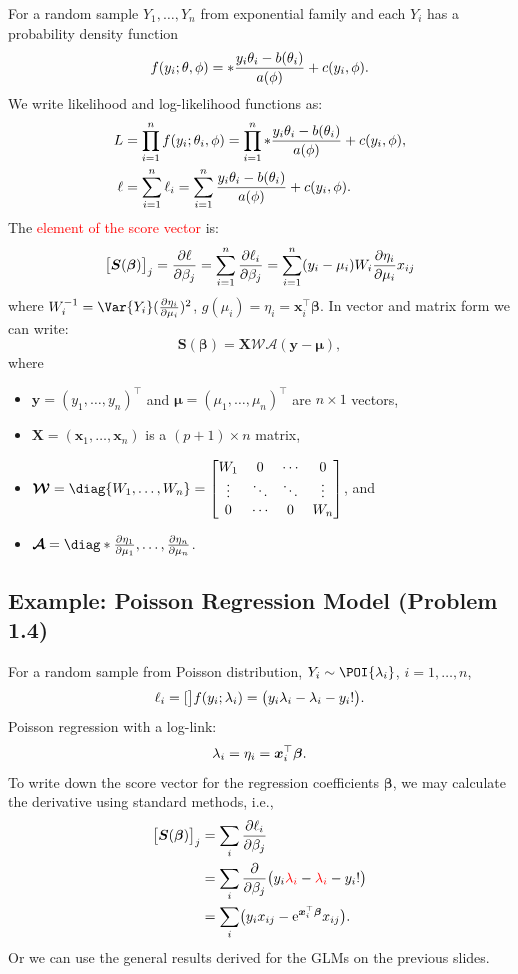\documentclass[oneside]{book}\usepackage[]{graphicx}\usepackage[svgnames]{xcolor}
\let\exp\relax%
\let\log\relax%
\providecommand{\Vector}[1]{\bm{#1}}%
\providecommand{\Matrix}[1]{\bm{#1}}
\providecommand{\MatrixCal}[1]{\bm{\mathcal{#1}}}
\begin{document}
For a random sample $ Y_1,\ldots,Y_n $ from exponential family and each $ Y_i $ has a probability density function
\[ f(y_i;\theta,\phi)=\exp*{\frac{y_i\theta_i-b(\theta_i)}{a(\phi)}+c(y_i,\phi)}. \]
We write likelihood and log-likelihood functions as:
\begin{align*}
    L    & =\prod_{i=1}^n f(y_i;\theta_i,\phi)=\prod_{i=1}^n\exp*{\frac{y_i\theta_i-b(\theta_i)}{a(\phi)}+c(y_i,\phi)}, \\
    \ell & =\sum_{i=1}^{n} \ell_i=\sum_{i=1}^{n}\frac{y_i\theta_i-b(\theta_i)}{a(\phi)}+c(y_i,\phi).
\end{align*}
The \textcolor{Red}{element of the score vector} is:
\[ \bigl[\Vector{S}(\Vector{\beta})\bigr]_j=\pdv{\ell}{\beta_j}=\sum_{i=1}^{n} \pdv{\ell_i}{\beta_j}=\sum_{i=1}^{n} (y_i-\mu_i)W_i\pdv{\eta_i}{\mu_i}x_{ij} \]
where $  W_i^{-1}=\Var{Y_i}(\pdv{\eta_i}{\mu_i})^2 $, $ g(\mu_i)=\eta_i=\Vector{x}_i^\top \Vector{\beta} $. In vector and matrix form we can write:
\[ \Vector{S}(\Vector{\beta})=\Matrix{X}\MatrixCal{W}\MatrixCal{A}(\Vector{y}-\Vector{\mu}), \]
where
\begin{itemize}
    \item $ \Vector{y}=(y_1,\ldots,y_n)^\top $ and $ \Vector{\mu}=(\mu_1,\ldots,\mu_n)^\top $ are $ n\times 1 $ vectors,
    \item $ \Matrix{X}=(\Vector{x}_1,\ldots,\Vector{x}_n) $ is a $ (p+1)\times n $ matrix,
    \item $ \MatrixCal{W}=\diag{W_1,\ldots,W_n}=\begin{bmatrix}
                  W_1    & 0      & \cdots & 0      \\
                  \vdots & \ddots & \ddots & \vdots \\
                  0      & \cdots & 0      & W_n
              \end{bmatrix} $, and
    \item $ \MatrixCal{A}=\diag*{\pdv{\eta_1}{\mu_1},\ldots,\pdv{\eta_n}{\mu_n}} $.
\end{itemize}
\subsection*{Example: Poisson Regression Model (Problem 1.4)}
For a random sample from Poisson distribution, $ Y_i \sim \POI{\lambda_i} $, $ i=1,\ldots,n $,
\[ \ell_i=\log[\big]{f(y_i;\lambda_i)}=\bigl(y_i\log{\lambda_i}-\lambda_i-\log{y_i!}\bigr). \]
Poisson regression with a log-link:
\[ \log{\lambda_i}=\eta_i=\Vector{x}_i^\top \Vector{\beta}. \]
To write down the score vector for the regression coefficients $ \Vector{\beta} $, we may
calculate the derivative using standard methods, i.e.,
\begin{align*}
    \bigl[\Vector{S}(\Vector{\beta})\bigr]_j
     & =\sum_i \pdv{\ell_i}{\beta_j}                                                                                  \\
     & =\sum_i \pdv*{\bigl(y_i \textcolor{Red}{\log{\lambda_i}}-\textcolor{Red}{\lambda_i}-\log{y_i!}\bigr)}{\beta_j} \\
     & =\sum_i\bigl(y_i x_{ij}-\mathrm{e}^{\Vector{x}_i^\top \Vector{\beta}}x_{ij}\bigr).
\end{align*}
Or we can use the general results derived for the GLMs on the previous slides.
\end{document}
